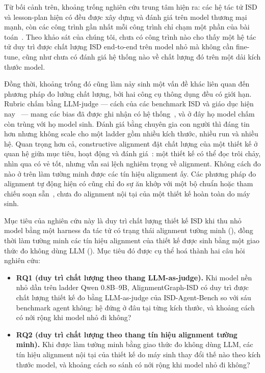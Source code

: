 Từ bối cảnh trên, khoảng trống nghiên cứu trung tâm hiện ra: các hệ tác tử ISD và
lesson-plan hiện có đều được xây dựng và đánh giá trên model thương mại mạnh, còn
các công trình gần nhất mỗi công trình chỉ chạm một phần của bài
toán~\cite{jaldi2026slmassessment,zheng2025lessonplanlm,reza2025smallmodels,lee2026educlaw,wei2026slmeducation}.
Theo khảo sát của chúng tôi, chưa có công trình nào cho thấy một hệ tác tử duy
trì được chất lượng ISD end-to-end trên model nhỏ mà không cần fine-tune, cũng
như chưa có đánh giá hệ thống nào về chất lượng đó trên một dải kích thước model.

Đồng thời, khoảng trống đó cũng làm nảy sinh một vấn đề khác liên quan đến phương pháp đo lường chất lượng,
bởi hai công cụ thông dụng đều có giới hạn. Rubric chấm bằng LLM-judge --- cách của các
benchmark ISD và giáo dục hiện
nay~\cite{isdagentbench,edubench2025,tutorbench2025,mathtutorbench2025} --- mang
các bias đã được ghi nhận có hệ
thống~\cite{zheng2023judging,panickssery2024llm,norman2026reliability}, và ở đây
họ model chấm còn trùng với họ model sinh. Đánh giá bằng chuyên gia con người thì
đáng tin hơn nhưng không scale cho một ladder gồm nhiều kích thước, nhiều run và
nhiều hệ. Quan trọng hơn cả, constructive alignment đặt chất lượng của một thiết
kế ở quan hệ giữa mục tiêu, hoạt động và đánh giá~\cite{biggs1996enhancing}: một
thiết kế có thể đọc trôi chảy, nhìn qua có vẻ tốt, nhưng vẫn sai lệch nghiêm trọng về
alignment. Không cách đo nào ở trên làm tường minh được các tín hiệu alignment
ấy. Các phương pháp đo alignment tự động hiện có cũng chỉ đo sự ăn khớp
với một bộ chuẩn hoặc tham chiếu soạn
sẵn~\cite{porter2002measuring,webb1997criteria,xu2025itemalignment,silva2026lessonbench},
chưa đo alignment nội tại của một thiết kế hoàn toàn do máy sinh.

Mục tiêu của nghiên cứu này là duy trì chất lượng thiết kế ISD khi thu nhỏ model
bằng một harness đa tác tử có trạng thái alignment tường minh
(), đồng thời làm tường minh các tín hiệu alignment của thiết kế
được sinh bằng một giao thức đo không dùng LLM (). Mục tiêu đó
được cụ thể hoá thành hai câu hỏi nghiên cứu:
\begin{itemize}
  \item \textbf{RQ1 (duy trì chất lượng theo thang LLM-as-judge).} Khi model nền
  nhỏ dần trên ladder Qwen 0.8B--9B, AlignmentGraph-ISD có duy trì được chất lượng
  thiết kế đo bằng LLM-as-judge của ISD-Agent-Bench so với sáu benchmark agent
  không: hệ đứng ở đâu tại từng kích thước, và khoảng cách có nới rộng khi model
  nhỏ đi không?
  \item \textbf{RQ2 (duy trì chất lượng theo thang tín hiệu alignment tường minh).} Khi được làm tường
  minh bằng giao thức đo không dùng LLM, các tín hiệu alignment nội tại của thiết
  kế do máy sinh thay đổi thế nào theo kích thước model, và khoảng cách so sánh có
  nới rộng khi model nhỏ đi không?
\end{itemize}


